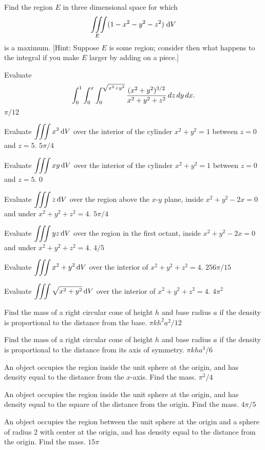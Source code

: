 \begin{multicols}{2}
\subprob Find the region $E$ in three dimensional space for which
\[
\displaystyle\iiint\limits_{E} (1-x^2-y^2-z^2) \; \mathrm{d} V
\]
is a maximum.  [Hint: Suppose $E$ is some region; consider then 
what happens to the integral if you make $E$ larger by adding on a
piece.]






\problem Evaluate
\[
\int_{0}^{1}\int_{0}^{x}\int_{0}^{\sqrt{x^2+y^2}} 
{(x^2+y^2)^{3/2}\over x^2+y^2+z^2}\,dz\,dy\,dx.  
\]
\answer
$\pi/12$
\endanswer

\problem Evaluate $\displaystyle\iiint x^2\,\mathrm{d} V $ 
over the interior of the cylinder $x^2+y^2=1$ between $z=0$ and $z=5$.
\answer
$5\pi/4$
\endanswer

\problem Evaluate $\displaystyle\iiint xy\,\mathrm{d} V $ 
over the interior of the cylinder $x^2+y^2=1$ between $z=0$ and $z=5$.
\answer
$0$
\endanswer

\problem Evaluate $\displaystyle\iiint z\,\mathrm{d} V $ 
over the region above the $x$-$y$ plane, inside $x^2+y^2-2x=0$ and
under $x^2+y^2+z^2=4$.
\answer
$5\pi/4$
\endanswer

\problem Evaluate $\displaystyle\iiint yz\,\mathrm{d} V $ 
over the region in the first octant, inside $x^2+y^2-2x=0$ and 
under $x^2+y^2+z^2=4$.
\answer
$4/5$
\endanswer

\problem Evaluate $\displaystyle\iiint x^2+y^2\,\mathrm{d} V $ 
over the interior of $x^2+y^2+z^2=4$.
\answer
$256\pi/15$
\endanswer

\problem Evaluate $\displaystyle\iiint \sqrt{x^2+y^2}\,\mathrm{d} V $ 
over the interior of $x^2+y^2+z^2=4$.
\answer
$4\pi^2$
\endanswer

\problem Find the mass of a right circular cone of height $h$ and 
base radius $a$ if the density is proportional to the distance from
the base.
\answer
$\pi kh^2a^2/12$
\endanswer

\problem Find the mass of a right circular cone of height $h$ and 
base radius $a$ if the density is proportional to the distance from
its axis of symmetry.
\answer
$\pi kha^3/6$
\endanswer

\problem An object occupies the region inside the unit sphere at the 
origin, and has density equal to the distance from the $x$-axis. Find
the mass.
\answer
$\pi^2/4$
\endanswer

\problem An object occupies the region inside the unit sphere at the 
origin, and has density equal to the square of the distance from the
origin. Find the mass.
\answer
$4\pi/5$
\endanswer

\problem An object occupies the region between the unit sphere at the 
origin and a sphere of radius 2 with center at the origin, and has
density equal to the distance from the origin. Find the mass.
\answer
$15\pi$
\endanswer





\end{multicols}
\noproblemfont



